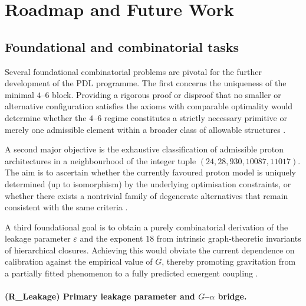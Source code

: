 \documentclass[11pt,a4paper]{article}
\begin{document}
\section{Roadmap and Future Work}
\label{sec:roadmap}

\subsection{Foundational and combinatorial tasks}
\label{subsec:roadmap_foundational}

Several foundational combinatorial problems are pivotal for the further development of the PDL programme. The first concerns the uniqueness of the minimal $4$–$6$ block. Providing a rigorous proof or disproof that no smaller or alternative configuration satisfies the axioms with comparable optimality would determine whether the $4$–$6$ regime constitutes a strictly necessary primitive or merely one admissible element within a broader class of allowable structures \citep{PDL_Main_2026,PDL_position}. 

A second major objective is the exhaustive classification of admissible proton architectures in a neighbourhood of the integer tuple $(24,28,930,10087,11017)$. The aim is to ascertain whether the currently favoured proton model is uniquely determined (up to isomorphism) by the underlying optimisation constraints, or whether there exists a nontrivial family of degenerate alternatives that remain consistent with the same criteria \citep{Combinatorial_Proton_v2_2026,PDL_position}. 

A third foundational goal is to obtain a purely combinatorial derivation of the leakage parameter $\varepsilon$ and the exponent $18$ from intrinsic graph-theoretic invariants of hierarchical closures. Achieving this would obviate the current dependence on calibration against the empirical value of $G$, thereby promoting gravitation from a partially fitted phenomenon to a fully predicted emergent coupling \citep{Exponent_18_PDL_2026,Coherence_Leakage_18_2026,PDL_position}.
\paragraph{(R\_Leakage) Primary leakage parameter and $G$--$\alpha$ bridge.}
\end{document}
